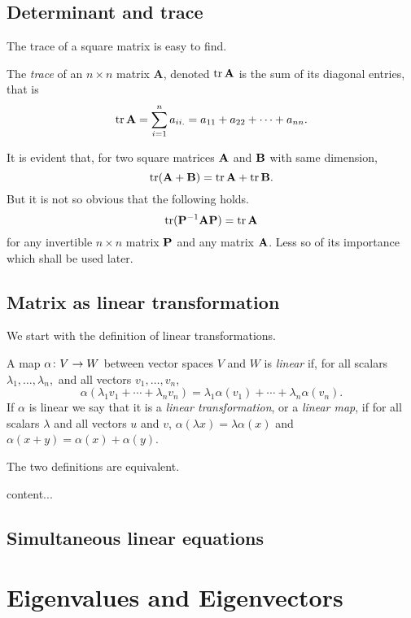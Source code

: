\documentclass[main.tex]{subfiles}
\begin{document}
		\subsection{Determinant and trace}
			The trace of a square matrix is easy to find.
			\begin{theorem}
				The \textit{trace}  of an $n \times n$ matrix $\mathbf{A}$, denoted $\operatorname{tr} \mathbf{A}$ is the sum of its diagonal entries, that is
				\begin{equation*}
					\operatorname{tr} \mathbf{A} = \sum_{i = 1}^{n} a_{ii.} = a_{11} + a_{22} + \cdots + a_{nn}.
				\end{equation*}
			\end{theorem}
			It is evident that, for two square matrices $\mathbf{A}$ and $\mathbf{B}$ with same dimension,
			\begin{equation*}
				\operatorname{tr}(\mathbf{A + B}) = \operatorname{tr}\mathbf{A} + \operatorname{tr}\mathbf{B}.
			\end{equation*}
			But it is not so obvious that the following holds.
			\begin{equation*}
				\operatorname{tr}(\mathbf{P}^{-1}\mathbf{AP}) = \operatorname{tr}\mathbf{A}
			\end{equation*}
			for any invertible $n\times n$ matrix $\mathbf{P}$ and any matrix $\mathbf{A}$. Less so of its importance which shall be used later.
			
		\subsection{Matrix as linear transformation}
			We start with the definition of linear transformations.
			\begin{definition}
				A map $\alpha \colon V \rightarrow W$ between vector spaces $V$ and $W$ is \textit{linear} if, for all scalars $\lambda_1, \ldots, \lambda_n,$ and all vectors $v_1, \ldots, v_n$,
				\begin{equation*}
					\alpha\left(\lambda_1v_1 + \cdots + \lambda_n v_n\right) = \lambda_1\alpha(v_1) + \cdots + \lambda_n\alpha(v_n).
				\end{equation*}
			If $\alpha$ is linear we say that it is a \textit{linear transformation}, or a \textit{linear map}, if for all scalars $\lambda$ and all vectors $u$ and $v$, $\alpha(\lambda x) = \lambda\alpha(x)$ and $\alpha( x + y) = \alpha (x) + \alpha(y)$.
			\end{definition}
		The two definitions are equivalent.
			\begin{theorem}[Rank-nullity theorem]
				content...
			\end{theorem}
		
		\subsection{Simultaneous linear equations}
		
		\section{Eigenvalues and Eigenvectors}
\end{document}
